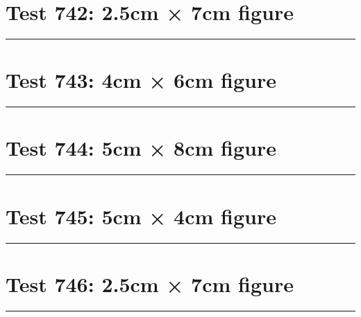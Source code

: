 \documentclass[a4paper,11pt]{article}
\begin{document}
\section*{Test 742: 2.5cm × 7cm figure}
\begin{swarmwrap}%
  \begin{minipage}[t]{2cm}
    \centering
    \rule{\linewidth}{7cm}
  \end{minipage}%
\end{swarmwrap}%
\swarmwrapnext
\lipsum[76]
\lipsum[77]
\lipsum[78]
\lipsum[79]
\lipsum[80]
\section*{Test 743: 4cm × 6cm figure}
\begin{swarmwrap}%
  \begin{minipage}[t]{4cm}
    \centering
    \rule{\linewidth}{6cm}
  \end{minipage}%
\end{swarmwrap}%
\swarmwrapnext
\lipsum[36]
\lipsum[37]
\lipsum[38]
\section*{Test 744: 5cm × 8cm figure}
\begin{swarmwrap}%
  \begin{minipage}[t]{5cm}
    \centering
    \rule{\linewidth}{8cm}
  \end{minipage}%
\end{swarmwrap}%
\swarmwrapnext
\lipsum[72]
\lipsum[73]
\lipsum[74]
\section*{Test 745: 5cm × 4cm figure}
\begin{swarmwrap}%
  \begin{minipage}[t]{5cm}
    \centering
    \rule{\linewidth}{4cm}
  \end{minipage}%
\end{swarmwrap}%
\swarmwrapnext
\lipsum[65]
\lipsum[66]
\lipsum[67]
\lipsum[68]
\section*{Test 746: 2.5cm × 7cm figure}
\begin{swarmwrap}%
  \begin{minipage}[t]{2cm}
    \centering
    \rule{\linewidth}{7cm}
  \end{minipage}%
\end{swarmwrap}%
\swarmwrapnext
\lipsum[102]
\lipsum[103]
\lipsum[104]
\lipsum[105]
\end{document}
